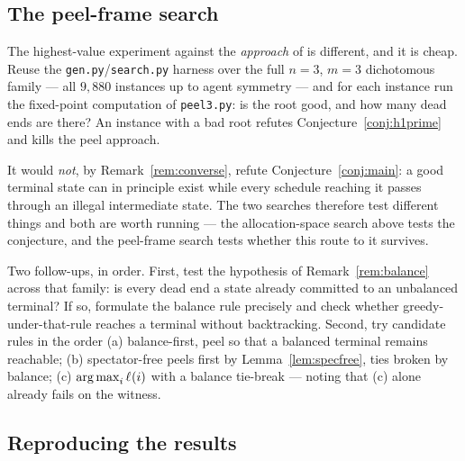 \subsection{The peel-frame search}
\label{sec:peelsearch}

The highest-value experiment against the \emph{approach} of
 is different, and it is cheap. Reuse the
\texttt{gen.py}/\texttt{search.py} harness over the full $n = 3$, $m = 3$
dichotomous family --- all $9{,}880$ instances up to agent symmetry --- and for
each instance run the fixed-point computation of \texttt{peel3.py}: is the root
good, and how many dead ends are there? An instance with a bad root refutes
Conjecture~\ref{conj:h1prime} and kills the peel approach.

It would \emph{not}, by Remark~\ref{rem:converse}, refute
Conjecture~\ref{conj:main}: a good terminal state can in principle exist while
every schedule reaching it passes through an illegal intermediate state. The two
searches therefore test different things and both are worth running --- the
allocation-space search above tests the conjecture, and the peel-frame search
tests whether this route to it survives.

Two follow-ups, in order. First, test the hypothesis of
Remark~\ref{rem:balance} across that family: is every dead end a state already
committed to an unbalanced terminal? If so, formulate the balance rule precisely
and check whether greedy-under-that-rule reaches a terminal without
backtracking. Second, try candidate rules in the order (a) balance-first, peel
so that a balanced terminal remains reachable; (b) spectator-free peels first by
Lemma~\ref{lem:specfree}, ties broken by balance; (c) $\operatorname*{arg\,max}_i \ell_{}(i)$
with a balance tie-break --- noting that (c) alone already fails on the witness.

\subsection{Reproducing the results}
\label{sec:repro}

